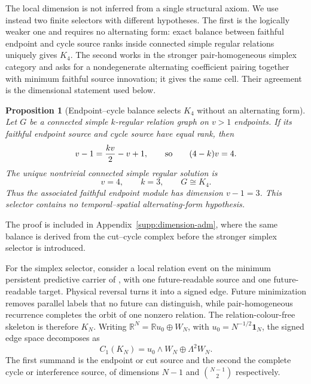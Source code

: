 \documentclass[11pt]{article}
\newtheorem{proposition}[proposition]{Proposition}
\theoremstyle{definition}
\theoremstyle{remark}
\newcommand{\R}{\mathbb R}
\newcommand{\one}{\mathbf 1}
\begin{document}
The local dimension is not inferred from a single structural axiom.  We use
instead two finite selectors with different hypotheses.  The first is the
logically weaker one and requires no alternating form: exact balance between
faithful endpoint and cycle source ranks inside connected simple regular
relations uniquely gives $K_4$.  The second works in the stronger
pair-homogeneous simplex category and asks for a nondegenerate alternating
coefficient pairing together with minimum faithful source innovation; it gives
the same cell.  Their agreement is the dimensional statement used below.

\begin{proposition}[Endpoint--cycle balance selects $K_4$ without an alternating form]
\label{prop:main-regular-graph-k4}
Let $G$ be a connected simple $k$-regular relation graph on $v>1$ endpoints.
If its faithful endpoint source and cycle source have equal rank, then
\begin{equation}
 v-1=\frac{kv}{2}-v+1,
 \qquad\hbox{so}\qquad
 (4-k)v=4.
 \label{eq:main-regular-graph-balance}
\end{equation}
The unique nontrivial connected simple regular solution is
\begin{equation}
 \boxed{v=4,\qquad k=3,\qquad G\cong K_4.}
 \label{eq:main-regular-graph-k4}
\end{equation}
Thus the associated faithful endpoint module has dimension $v-1=3$.  This
selector contains no temporal--spatial alternating-form hypothesis.
\end{proposition}

The proof is included in Appendix~\ref{supp:dimension-adm}, where the same
balance is derived from the cut--cycle complex before the stronger simplex
selector is introduced.

For the simplex selector, consider a local relation event on the minimum
persistent predictive carrier of , with one
future-readable source and one future-readable target.  Physical reversal
turns it into a signed edge.  Future minimization removes parallel labels that
no future can distinguish, while pair-homogeneous recurrence completes the
orbit of one nonzero relation.  The relation-colour-free skeleton is therefore
$K_N$.  Writing $\R^N=\R u_0\oplus W_N$, with
$u_0=N^{-1/2}\one_N$, the signed edge space decomposes as
\begin{equation}
 C_1(K_N)=u_0\wedge W_N\oplus\Lambda^2W_N.
 \label{eq:cut-cycle-main}
\end{equation}
The first summand is the endpoint or cut source and the second the complete
cycle or interference source, of dimensions $N-1$ and
$\binom{N-1}{2}$ respectively.
\end{document}
